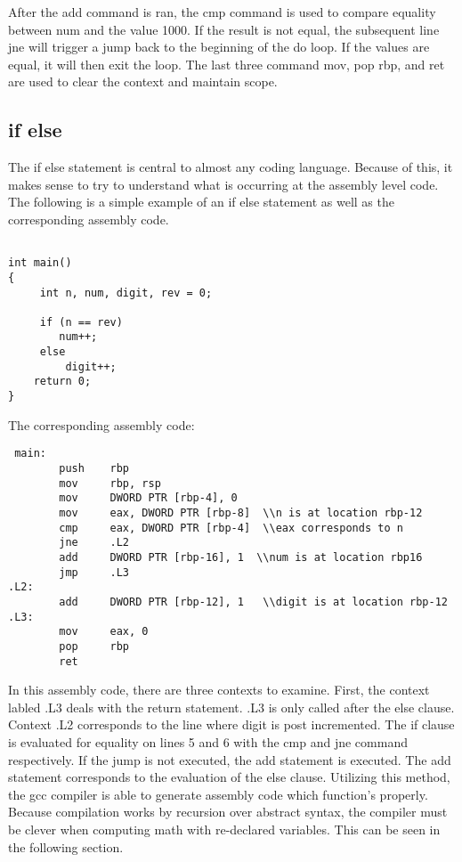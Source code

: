 \documentclass{article}
\theoremstyle{theorem}
\theoremstyle{definition}
\theoremstyle{remark}
\begin{document}
After the add command is ran, the cmp command is used to compare equality between num and the value 1000. If the result is not equal, the subsequent line jne will trigger a jump back to the beginning of the do loop. If the values are equal, it will then exit the loop. The last three command mov, pop rbp, and ret are used to clear the context and maintain scope.

\subsection{if else}

The if else statement is central to almost any coding language. Because of this, it makes sense to try to understand what is occurring at the assembly level code. The following is a simple example of an if else statement as well as the corresponding assembly code.
 
\begin{lstlisting}

int main()
{
     int n, num, digit, rev = 0;
    
     if (n == rev)
        num++;
     else
         digit++;
    return 0;
}
\end{lstlisting}
The corresponding assembly code:
\begin{lstlisting}
 main:
        push    rbp
        mov     rbp, rsp
        mov     DWORD PTR [rbp-4], 0
        mov     eax, DWORD PTR [rbp-8]  \\n is at location rbp-12
        cmp     eax, DWORD PTR [rbp-4]  \\eax corresponds to n
        jne     .L2
        add     DWORD PTR [rbp-16], 1  \\num is at location rbp16
        jmp     .L3
.L2:
        add     DWORD PTR [rbp-12], 1   \\digit is at location rbp-12
.L3:
        mov     eax, 0
        pop     rbp
        ret
\end{lstlisting}

In this assembly code, there are three contexts to examine. First, the context labled .L3 deals with the return statement. .L3 is only called after the else clause. Context .L2 corresponds to the line where digit is post incremented. The if clause is evaluated for equality on lines 5 and 6 with the cmp and jne command respectively. If the jump is not executed, the add statement is executed. The add statement corresponds to the evaluation of the else clause. Utilizing this method, the gcc compiler is able to generate assembly code which function's properly. Because compilation works by recursion over abstract syntax, the compiler must be clever when computing math with re-declared variables. This can be seen in the following section.
\end{document}
